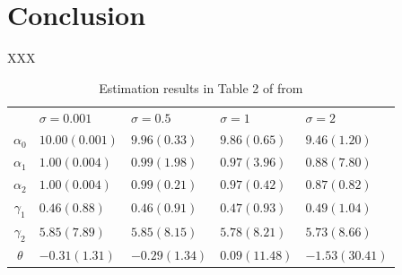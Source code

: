 \documentclass[11pt, a4paper]{article}
\begin{document}


    
\section{Conclusion}

XXX




\begin{table}[!htbp]
    \centering
    \caption{Estimation results in Table 2 of from \cite{perloff2012collinearity}}
    \label{tb:linear_linear_sigma_Perloff_Shen} 
        \begin{tabular}{cllll}
            \hline\hline
            & $\sigma=0.001$ & $\sigma=0.5$ & $\sigma=1$ & $\sigma=2$ \\
            $\alpha_0$ & $10.00(0.001)$ & $9.96(0.33)$ & $9.86(0.65)$ & $9.46(1.20)$ \\
            $\alpha_1$ & $1.00(0.004)$ & $0.99(1.98)$ & $0.97(3.96)$ & $0.88(7.80)$ \\
            $\alpha_2$ & $1.00(0.004)$ & $0.99(0.21)$ & $0.97(0.42)$ & $0.87(0.82)$ \\
            $\gamma_1$ & $0.46(0.88)$ & $0.46(0.91)$ & $0.47(0.93)$ & $0.49(1.04)$ \\
            $\gamma_2$ & $5.85(7.89)$ & $5.85(8.15)$ & $5.78(8.21)$ & $5.73(8.66)$ \\
            $\theta$ & $-0.31(1.31)$ & $-0.29(1.34)$ & $0.09(11.48)$ & $-1.53(30.41)$ \\
            \hline
        \end{tabular}
\end{table}
\end{document}
